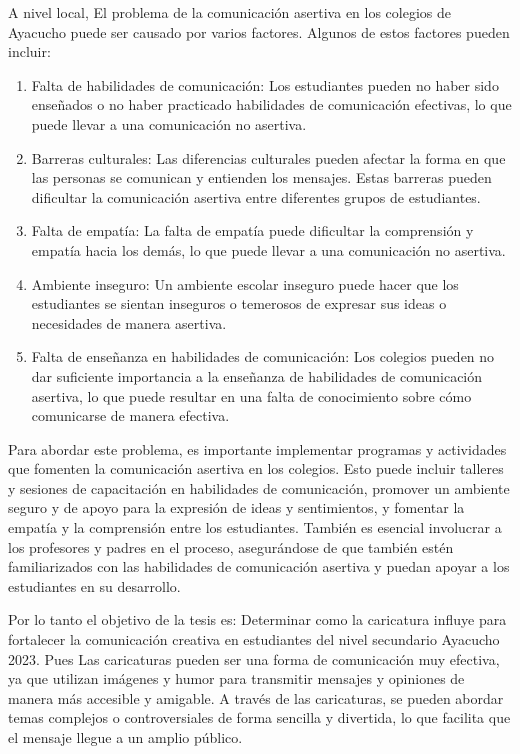 \documentclass[12pt,a4paper]{article}
\begin{document}
A nivel local, El problema de la comunicación asertiva en los colegios de Ayacucho puede ser causado por varios factores. Algunos de estos factores pueden incluir:

\begin{enumerate}
	\item  Falta de habilidades de comunicación: Los estudiantes pueden no haber sido enseñados o no haber practicado habilidades de comunicación efectivas, lo que puede llevar a una comunicación no asertiva.
	\item  Barreras culturales: Las diferencias culturales pueden afectar la forma en que las personas se comunican y entienden los mensajes. Estas barreras pueden dificultar la comunicación asertiva entre diferentes grupos de estudiantes.
	\item  Falta de empatía: La falta de empatía puede dificultar la comprensión y empatía hacia los demás, lo que puede llevar a una comunicación no asertiva.
	\item  Ambiente inseguro: Un ambiente escolar inseguro puede hacer que los estudiantes se sientan inseguros o temerosos de expresar sus ideas o necesidades de manera asertiva.
	\item  Falta de enseñanza en habilidades de comunicación: Los colegios pueden no dar suficiente importancia a la enseñanza de habilidades de comunicación asertiva, lo que puede resultar en una falta de conocimiento sobre cómo comunicarse de manera efectiva.

\end{enumerate}

Para abordar este problema, es importante implementar programas y actividades que fomenten la comunicación asertiva en los colegios. Esto puede incluir talleres y sesiones de capacitación en habilidades de comunicación, promover un ambiente seguro y de apoyo para la expresión de ideas y sentimientos, y fomentar la empatía y la comprensión entre los estudiantes. También es esencial involucrar a los profesores y padres en el proceso, asegurándose de que también estén familiarizados con las habilidades de comunicación asertiva y puedan apoyar a los estudiantes en su desarrollo.

Por lo tanto el objetivo de la tesis es: Determinar como la caricatura influye para fortalecer la comunicación creativa en estudiantes del nivel secundario Ayacucho 2023. Pues Las caricaturas pueden ser una forma de comunicación muy efectiva, ya que utilizan imágenes y humor para transmitir mensajes y opiniones de manera más accesible y amigable. A través de las caricaturas, se pueden abordar temas complejos o controversiales de forma sencilla y divertida, lo que facilita que el mensaje llegue a un amplio público.
\end{document}
